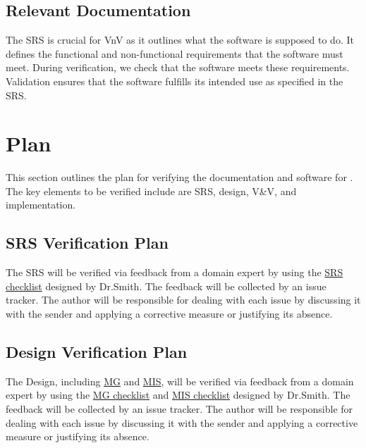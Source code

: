 \documentclass[12pt, titlepage]{article}
\begin{document}
\subsection{Relevant Documentation}

The SRS is crucial for VnV as it outlines what the software is supposed to do. It defines the functional and non-functional requirements that the software must meet.
During verification, we check that the software meets these requirements. Validation ensures that the software fulfills its intended use as specified in the SRS.

\citet{SRS}


\section{Plan}

This section outlines the plan for verifying the documentation and software for \progname. 
The key elements to be verified include are SRS, design, V\&V, and implementation.

\subsection{SRS Verification Plan}

The SRS \citet{SRS} will be verified via feedback from a domain expert by using the \href{https://github.com/BaptistePignier/CAS741-GameOfLife/blob/main/docs/Checklists/SRS-Checklist.pdf}{SRS checklist} designed by Dr.Smith. The feedback will be collected by an issue tracker.
The author will be responsible for dealing with each issue by discussing it with the sender and applying a corrective measure or justifying its absence.

\subsection{Design Verification Plan}

The Design, including \href{https://github.com/BaptistePignier/CAS741-GameOfLife/blob/main/docs/Design/SoftArchitecture/MG.pdf}{MG} and \href{https://github.com/BaptistePignier/CAS741-GameOfLife/blob/main/docs/Design/SoftDetailedDes/MIS.pdf}{MIS},
will be verified via feedback from a domain expert by using the \href{https://github.com/BaptistePignier/CAS741-GameOfLife/blob/main/docs/Checklists/MG-Checklist.pdf}{MG checklist} and \href{https://github.com/BaptistePignier/CAS741-GameOfLife/blob/main/docs/Checklists/MIS-Checklist.pdf}{MIS checklist} designed by Dr.Smith. The feedback will be collected by an issue tracker.
The author will be responsible for dealing with each issue by discussing it with the sender and applying a corrective measure or justifying its absence.
\end{document}
